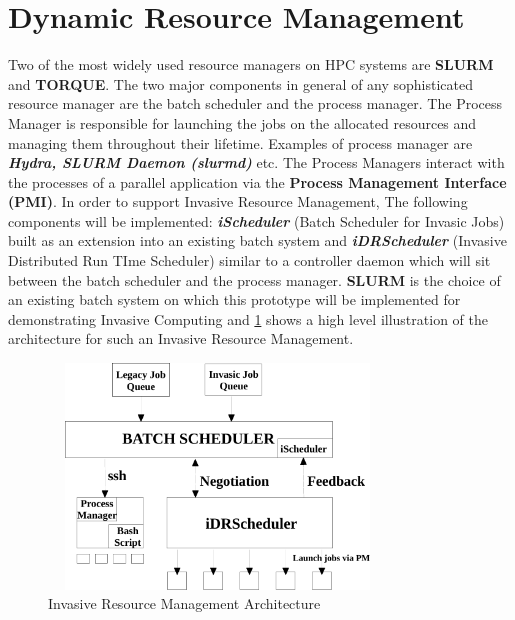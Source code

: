 \section{Dynamic Resource Management}
Two of the most widely used resource managers on HPC systems are \textbf{SLURM} and \textbf{TORQUE}. The two major components in general of any sophisticated resource manager are the batch scheduler and the process manager. The Process Manager is responsible for launching the jobs on the allocated resources and managing them throughout their lifetime. Examples of process manager are \textbf{\textit{Hydra, SLURM Daemon (slurmd)}} etc. The Process Managers interact with the processes of a parallel application via the \textbf{Process Management Interface (PMI)}. In order to support Invasive Resource Management, The following components will be implemented: \textbf{\textit{iScheduler}} (Batch Scheduler for Invasic Jobs) built as an extension into an existing batch system and \textbf{\textit{iDRScheduler}} (Invasive Distributed Run TIme Scheduler) similar to a controller daemon which will sit between the batch scheduler and the process manager. \textbf{SLURM} is the choice of an existing batch system on which this prototype will be implemented for demonstrating Invasive Computing and \ref{fig:1} shows a high level illustration of the architecture for such an Invasive Resource Management.\\ \par
\begin{figure}[!htbp]
\centering
\includegraphics[width=0.8\textwidth, height=60mm]{./figures/architecture.pdf}
\caption{Invasive Resource Management Architecture}
\label{fig:1}
\end{figure}
\noindent
